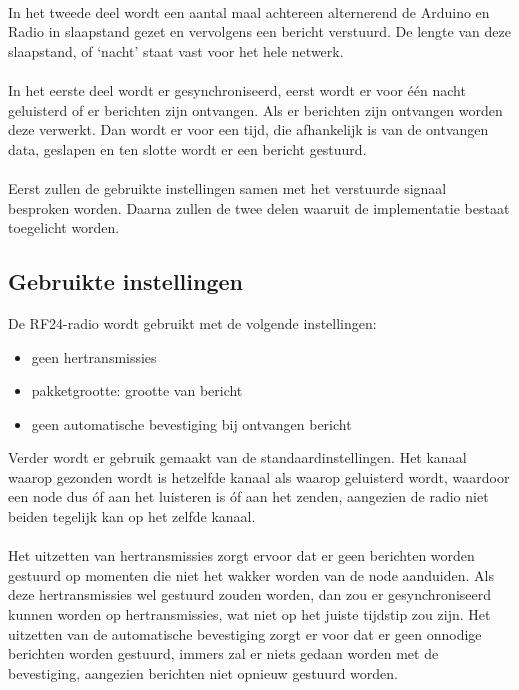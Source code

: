 \documentclass{article}
\begin{document}
\\
In het tweede deel wordt een aantal maal achtereen alternerend de Arduino en Radio in slaapstand gezet en vervolgens een bericht verstuurd. De lengte van deze slaapstand, of `nacht' staat vast voor het hele netwerk.\\
\\
In het eerste deel wordt er gesynchroniseerd, eerst wordt er voor 
\'e\'en nacht geluisterd of er berichten zijn ontvangen. Als er berichten zijn ontvangen worden deze verwerkt. Dan wordt er voor een tijd, die afhankelijk is van de ontvangen data, geslapen en ten slotte wordt er een bericht gestuurd. \\
\\
Eerst zullen de gebruikte instellingen samen met het verstuurde signaal besproken worden. Daarna zullen de twee delen waaruit de implementatie bestaat toegelicht worden. 

\subsection{Gebruikte instellingen}
De RF24-radio wordt gebruikt met de volgende instellingen:
\begin{itemize}
  \item geen hertransmissies
  \item pakketgrootte: grootte van bericht
  \item geen automatische bevestiging bij ontvangen bericht
\end{itemize}
Verder wordt er gebruik gemaakt van de standaardinstellingen. Het kanaal waarop gezonden wordt is hetzelfde kanaal als waarop geluisterd wordt, waardoor een node dus \'of aan het luisteren is \'of aan het zenden, aangezien de radio niet beiden tegelijk kan op het zelfde kanaal.\\
\\
Het uitzetten van hertransmissies zorgt ervoor dat er geen berichten worden gestuurd op momenten die niet het wakker worden van de node aanduiden. Als deze hertransmissies wel gestuurd zouden worden, dan zou er gesynchroniseerd kunnen worden op hertransmissies, wat niet op het juiste tijdstip zou zijn. Het uitzetten van de automatische bevestiging zorgt er voor dat er geen onnodige berichten worden gestuurd, immers zal er niets gedaan worden met de bevestiging, aangezien berichten niet opnieuw gestuurd worden.
\end{document}
